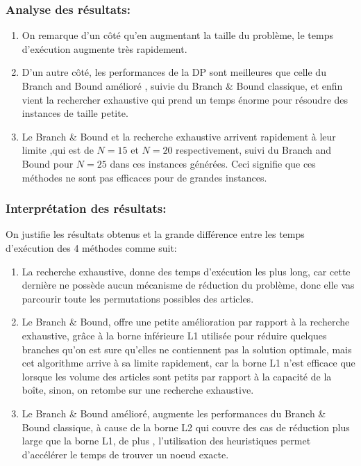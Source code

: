 \documentclass[12pt]{article}
\begin{document}
\subsubsection{Analyse des résultats:}
\begin{enumerate}
    \item On remarque d’un côté qu’en augmentant la taille du problème, le temps d'exécution augmente très rapidement.
    \item D’un autre côté, les performances de la DP sont meilleures que celle du Branch and Bound amélioré , suivie du Branch \& Bound classique, et enfin vient la rechercher exhaustive qui prend un temps énorme pour résoudre des instances de taille petite. 
    \item Le Branch \& Bound et la recherche exhaustive arrivent rapidement à leur limite ,qui est de \(N=15\) et \(N=20\) respectivement, suivi du Branch and Bound pour \(N=25\) dans ces instances générées. Ceci signifie que ces méthodes ne sont pas efficaces pour de grandes instances.
\end{enumerate}
\subsubsection{Interprétation des résultats:}
On justifie les résultats obtenus et la grande différence entre les temps d’exécution des 4 méthodes comme suit: 
\begin{enumerate}
    \item La recherche exhaustive, donne des temps d'exécution les plus long, car cette dernière ne possède aucun mécanisme de réduction du problème, donc elle vas parcourir toute les permutations possibles des articles.
    \item Le Branch \& Bound, offre une petite amélioration par rapport à la recherche exhaustive, grâce à la borne inférieure L1 utilisée pour réduire quelques branches qu’on est sure qu’elles ne contiennent pas la solution optimale, mais cet algorithme arrive à sa limite rapidement, car la borne L1 n’est efficace que lorsque les volume des articles sont petits par rapport à la capacité de la boîte, sinon, on retombe sur une recherche exhaustive.
    \item Le Branch \& Bound amélioré, augmente les performances du Branch \& Bound classique, à cause de la borne L2 qui couvre des cas de réduction plus large que la borne L1, de plus , l’utilisation des heuristiques permet d'accélérer le temps de trouver un noeud exacte.
\end{enumerate}
\end{document}
